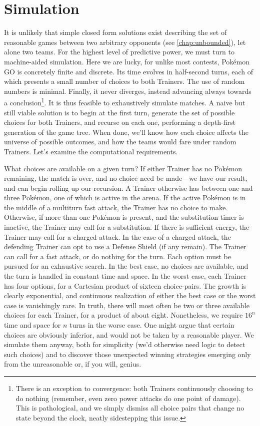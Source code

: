 \chapter{Simulation}
\label{chap:simul}

It is unlikely that simple closed form solutions exist describing
 the set of reasonable games between two arbitrary opponents (see \autoref{chap:unbounded}),
 let alone two teams.
For the highest level of predictive power, we must turn to machine-aided simulation.
Here we are lucky, for unlike most contests, Pokémon GO is concretely finite and discrete.
Its time evolves in half-second turns, each of which presents a small number of choices
  to both Trainers.
The use of random numbers is minimal.
Finally, it never diverges, instead advancing always towards a conclusion\footnote{There
  is an exception to convergence: both Trainers continuously choosing to do nothing (remember,
  even zero power attacks do one point of damage). This is pathological, and we
  simply dismiss all choice pairs that change no state beyond the clock, neatly sidestepping this issue.}.
It is thus feasible to exhaustively simulate matches.
A naive but still viable solution is to begin at the first turn, generate the set
  of possible choices for both Trainers, and recurse on each one, performing
  a depth-first generation of the game tree.
When done, we'll know how each choice affects the universe of possible outcomes,
  and how the teams would fare under random Trainers.
Let's examine the computational requirements.

What choices are available on a given turn?
If either Trainer has no Pokémon remaining, the match is over, and no choice
  need be made---we have our result, and can begin rolling up our recursion.
A Trainer otherwise has between one and three Pokémon, one of which is active
  in the arena.
If the active Pokémon is in the middle of a multiturn fast attack, the
  Trainer has no choice to make.
Otherwise, if more than one Pokémon is present, and the substitution timer is
  inactive, the Trainer may call for a substitution.
If there is sufficient energy, the Trainer may call for a charged attack.
In the case of a charged attack, the defending Trainer can opt to use a Defense
  Shield (if any remain).
The Trainer can call for a fast attack, or do nothing for the turn.
Each option must be pursued for an exhaustive search.
In the best case, no choices are available, and the turn is handled in constant
  time and space.
In the worst case, each Trainer has four options, for a Cartesian product
  of sixteen choice-pairs.
The growth is clearly exponential, and continuous realization of either the
  best case or the worst case is vanishingly rare.
In truth, there will most often be two or three available choices for each Trainer,
  for a product of about eight.
Nonetheless, we require $16^n$ time and space for $n$ turns in the worse case.
One might argue that certain choices are obviously inferior, and would not be taken
  by a reasonable player.
We simulate them anyway, both for simplicity (we'd otherwise need logic to
  detect such choices) and to discover those unexpected winning strategies
  emerging only from the unreasonable or, if you will, genius.

